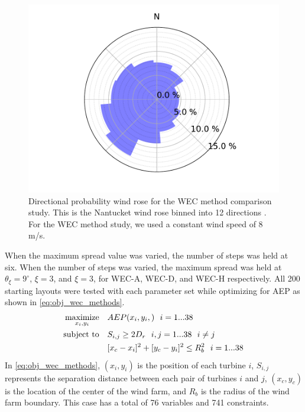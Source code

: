 \documentclass[a4paper]{jpconf}
\begin{document}
\begin{figure}[h!]
\begin{minipage}[t]{18pc}
		\includegraphics[width=\textwidth, trim={2.0cm 0cm 1.5cm 0cm}, clip]{final_images/windroses/freqwindrose_12_dir.pdf}
		\caption{Directional probability wind rose for the WEC method comparison study. This is the Nantucket wind rose binned into 12 directions \cite{wrcc2017}. For the WEC method study, we used a constant wind speed of 8 m/s.}
		\label{fig:nantucket12dirs}
	\end{minipage} 
\end{figure}


When the maximum spread value was varied, the number of steps was held at six. When the number of steps was varied, the maximum spread was held at $\theta_\xi = 9 ^\circ$, $\xi=3$, and $\xi=3$, for WEC-A, WEC-D, and WEC-H respectively. All 200 starting layouts were tested with each parameter set while optimizing for AEP as shown in \cref{eq:obj_wec_methods}. 
%
\begin{equation}
\label{eq:obj_wec_methods}
\begin{aligned} [b]
\underset{x_i,y_i}{\textrm{maximize}} \quad & AEP(x_i,y_i,)~~i=1...38\\
\textrm{subject to} \quad & S_{i,j} \geq 2\*D_{r}~~i,j=1...38~~i \neq j\\
& [x_c-x_i]^2+[y_c-y_i]^2 \leq R_{b}^2~~i=1...38
\end{aligned}
\end{equation}
%
In \cref{eq:obj_wec_methods}, $(x_i,y_i)$ is the position of each turbine $i$, $S_{i,j}$ represents the separation distance between each pair of turbines $i$ and $j$, $(x_c,y_c)$ is the location of the center of the wind farm, and $R_b$ is the radius of the wind farm boundary. This case has a total of 76 variables and 741 constraints.
\end{document}
